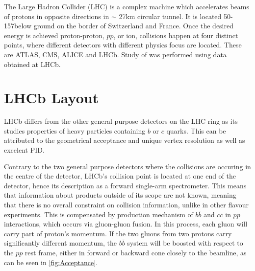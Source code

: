 The Large Hadron Collider (LHC) is a complex machine which accelerates beams of protons in opposite directions in $\sim$ 27km circular tunnel. It is located
50-157\m below ground on the border of Switzerland and France. Once the desired energy is achieved proton-proton, $pp$, or ion, collisions happen at four distinct points, where different detectors with different physics focus are located. These are \Gls{ATLAS}, \Gls{CMS}, \Gls{ALICE} and \Gls{LHCb}. 
Study of \Bmumumu was performed using data obtained at \Gls{LHCb}. 

\section{LHCb Layout}

\Gls{LHCb} differs from the other general purpose detectors on the LHC ring as its studies properties of heavy particles containing $b$ or $c$ quarks. This can be attributed to the geometrical acceptance and unique vertex resolution as well as excelent \Gls{PID}.

Contrary to the two general purpose detectors where the collisions are occuring in the centre of the detector, \Gls{LHCb}'s collision point is located at one end of the detector, hence its description as a forward single-arm spectrometer. This means that information about products outside of its scope are not known, meaning that there is no overall constraint on collision information, unlike in other flavour experiments. This is compensated by production mechanism of $b\bar{b}$ and $c\bar{c}$ in $pp$ interactions, which occurs via gluon-gluon fusion. In this process, each gluon will carry part of proton's momentum. If the two gluons from two protons carry significantly different momentum, the $b\bar{b}$ system will be boosted with respect to the $pp$ rest frame, either in forward or backward cone closely to the beamline, as can be seen in \autoref{fig:Acceptance}.



